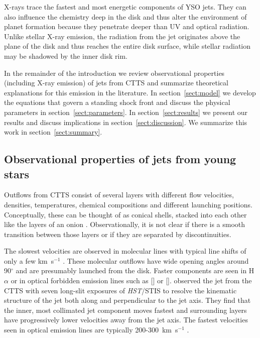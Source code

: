 \documentclass[manuscript]{aastex}
\begin{document}
X-rays trace the fastest and most energetic components of YSO jets. They can also influence the chemistry deep in the disk \citep[e.g.][]{2010ApJ...714.1511H,2012ApJ...756..157G} and thus alter the environment of planet formation because they penetrate deeper than UV and optical radiation. Unlike stellar X-ray emission, the radiation from the jet originates above the plane of the disk and thus reaches the entire disk surface, while stellar radiation may be shadowed by the inner disk rim.

In the remainder of the introduction we review observational properties (including X-ray emission) of jets from CTTS and summarize theoretical explanations for this emission in the literature. In section~\ref{sect:model} we develop the equations that govern a standing shock front and discuss the physical parameters in section~\ref{sect:parameters}. In section~\ref{sect:results} we present our results and discuss implications in section~\ref{sect:discussion}. We summarize this work in section~\ref{sect:summary}.

\subsection{Observational properties of jets from young stars}
\label{sect:introjetobs}
Outflows from CTTS consist of several layers with different flow velocities, densities, temperatures, chemical compositions and different launching positions. Conceptually, these can be thought of as conical shells, stacked into each other like the layers of an onion \citep{2000ApJ...537L..49B}. Observationally, it is not clear if there is a smooth transition between those layers or if they are separated by discontinuities. 

The slowest velocities are observed in molecular lines with typical line shifts of only a few km~s$^{-1}$ \citep{2008ApJ...676..472B}. These molecular outflows have wide opening angles around 90$^{\circ}$ \citep[e.g.][]{2013A&A...557A.110S,2014A&A...564A..11A} and are presumably launched from the disk. Faster components are seen in H$\alpha$ or in optical forbidden emission lines such as [] or []. \citet{2000ApJ...537L..49B} observed the jet from the CTTS  with seven long-slit exposures of \emph{HST}/STIS to resolve the kinematic structure of the jet both along and perpendicular to the jet axis. They find that the inner, most collimated jet component moves fastest and surrounding layers have progressively lower velocities away from the jet axis. The fastest velocities seen in optical emission lines are typically 200-300~km~s$^{-1}$ \citep{2004Ap&SS.292..651B,2008ApJ...689.1112C,2013A&A...550L...1S}.
\end{document}
